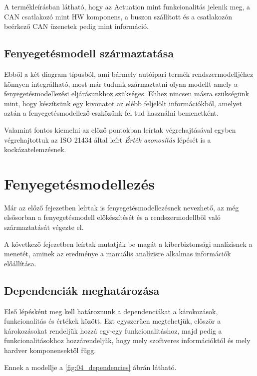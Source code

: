 A termékleírásban látható, hogy az Actuation mint funkcionalitás jelenik meg, a CAN csatlakozó mint HW komponens, a buszon szállított és a csatlakozón beérkező CAN üzenetek pedig mint információ. 

\subsection{Fenyegetésmodell származtatása}

Ebből a két diagram típusból, ami bármely autóipari termék rendszermodelljéhez könnyen integrálható, most már tudunk származtatni olyan modellt amely a fenyegetésmodellezési eljárásunkhoz szükséges. Ehhez nincsen másra szükségünk mint, hogy készítsünk egy kivonatot az elébb feljelölt információkból, amelyet aztán a fenyegetésmodellező eszközünk fel tud használni bemenetként.

Valamint fontos kiemelni az előző pontokban leírtak végrehajtásával egyben végrehajtottuk az ISO 21434 által leírt \textit{Érték azonosítás} lépését is a kockázatelemzésnek.

\section{Fenyegetésmodellezés}

Már az előző fejezetben leírtak is fenyegetésmodellezésnek nevezhető, az még elsősorban a fenyegetésmodell előkészítését és a rendszermodellből való származtatását végezte el.

A következő fejezetben leírtak mutatják be magát a kiberbiztonsági analízisnek a menetét, aminek az eredménye a manuális analízisre alkalmas információk előállítása.

\subsection{Dependenciák meghatározása}

Első lépésként meg kell határoznunk a dependenciákat a károkozások, funkcionalitás és értékek között. Ezt egyszerűen megtehetjük, először a károkozásokat rendeljük hozzá egy-egy funkcionalitáshoz, majd pedig a funkcionalitásokhoz hozzárendeljük, hogy mely szoftveres információktól és mely hardver komponensektől függ.

Ennek a modellje a \ref{fig:04_dependencies} ábrán látható.

